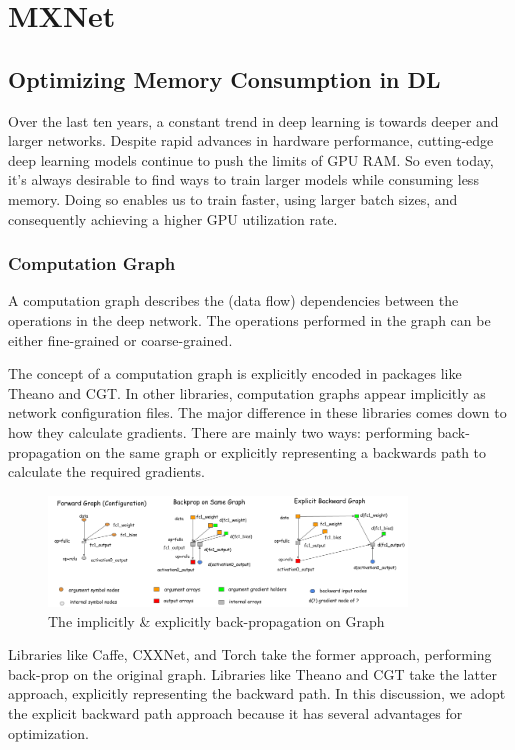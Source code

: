 \chapter{MXNet}
\section{Optimizing Memory Consumption in DL}
Over the last ten years, a constant trend in deep learning is towards deeper and larger networks. Despite rapid advances in hardware performance, cutting-edge deep learning models continue to push the limits of GPU RAM. So even today, it’s always desirable to find ways to train larger models while consuming less memory. Doing so enables us to train faster, using larger batch sizes, and consequently achieving a higher GPU utilization rate.

\subsection{Computation Graph}
A computation graph describes the (data flow) dependencies between the operations in the deep network. The operations performed in the graph can be either fine-grained or coarse-grained.

The concept of a computation graph is explicitly encoded in packages like Theano and CGT. In other libraries, computation graphs appear implicitly as network configuration files. The major difference in these libraries comes down to how they calculate gradients. There are mainly two ways: performing back-propagation on the same graph or explicitly representing a backwards path to calculate the required gradients.

\begin{figure}[!hbtp]
\centering
\includegraphics[width=0.85\textwidth]{MXNet/back_graph}
\caption{The implicitly \& explicitly back-propagation on Graph}
\end{figure}

Libraries like Caffe, CXXNet, and Torch take the former approach, performing back-prop on the original graph. Libraries like Theano and CGT take the latter approach, explicitly representing the backward path. In this discussion, we adopt the explicit backward path approach because it has several advantages for optimization.

